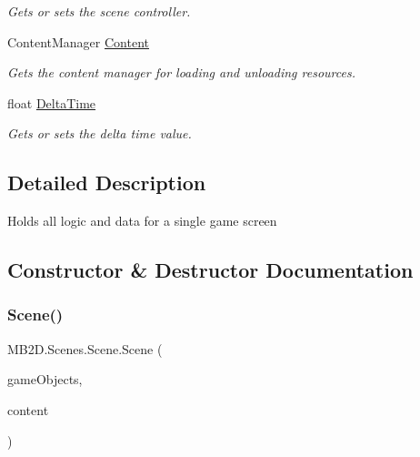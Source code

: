 \begin{DoxyCompactItemize}
\begin{DoxyCompactList}\small\item\em Gets or sets the scene controller. \end{DoxyCompactList}\item 
Content\+Manager \hyperlink{class_m_b2_d_1_1_scenes_1_1_scene_a8d5434f75a273135d8bae9ce36cc69ee}{Content}
\begin{DoxyCompactList}\small\item\em Gets the content manager for loading and unloading resources. \end{DoxyCompactList}\item 
float \hyperlink{class_m_b2_d_1_1_scenes_1_1_scene_a43b51703cf436d8033fac12386b300ba}{Delta\+Time}
\begin{DoxyCompactList}\small\item\em Gets or sets the delta time value. \end{DoxyCompactList}\end{DoxyCompactItemize}


\subsection{Detailed Description}
Holds all logic and data for a single game screen 



\subsection{Constructor \& Destructor Documentation}
\hypertarget{class_m_b2_d_1_1_scenes_1_1_scene_ac9cb0c45a98614e7e4c1307ebb6ef85e}{}\label{class_m_b2_d_1_1_scenes_1_1_scene_ac9cb0c45a98614e7e4c1307ebb6ef85e} 
\subsubsection{\texorpdfstring{Scene()}{Scene()}}
{\footnotesize\ttfamily M\+B2\+D.\+Scenes.\+Scene.\+Scene (\begin{DoxyParamCaption}\item[{\hyperlink{class_m_b2_d_1_1_entity_component_1_1_entity_map}{Entity\+Map}}]{game\+Objects,  }\item[{Content\+Manager}]{content }\end{DoxyParamCaption})\hspace{0.3cm}{\ttfamily [inline]}}



